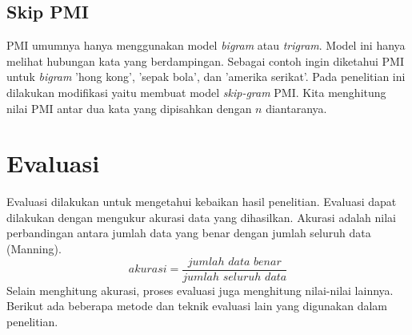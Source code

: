 \subsection{Skip PMI}
PMI umumnya hanya menggunakan model \textit{bigram} atau \textit{trigram}. Model ini hanya melihat hubungan kata yang berdampingan. Sebagai contoh ingin diketahui PMI untuk \textit{bigram} 'hong kong', 'sepak bola', dan 'amerika serikat'. Pada penelitian ini dilakukan modifikasi yaitu membuat model \textit{skip-gram} PMI. Kita menghitung nilai PMI antar dua kata yang dipisahkan dengan $n$ diantaranya. 

\section{Evaluasi}
Evaluasi dilakukan untuk mengetahui kebaikan hasil penelitian. Evaluasi dapat dilakukan dengan mengukur akurasi data yang dihasilkan. Akurasi adalah nilai perbandingan antara jumlah data yang benar dengan jumlah seluruh data (Manning). 
\[ akurasi=\frac{jumlah\,\,data\,\,benar}{jumlah\,\,seluruh\,\,data} \]
Selain menghitung akurasi, proses evaluasi juga menghitung nilai-nilai lainnya. Berikut ada beberapa metode dan teknik evaluasi lain yang digunakan dalam penelitian.

